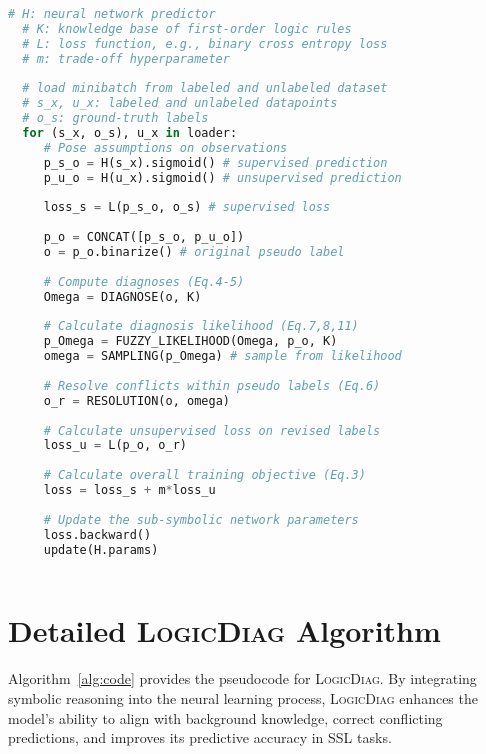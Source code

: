 \documentclass[10pt,twocolumn,letterpaper]{article}
\def\Ours{{\textsc{LogicDiag}}}
\begin{document}
\begin{algorithm}[t]
  \caption{{\Ours} Pseudocode, PyTorch-like style}
  \label{alg:code}
  \begin{lstlisting}[language=python]
  # H: neural network predictor
  # K: knowledge base of first-order logic rules
  # L: loss function, e.g., binary cross entropy loss
  # m: trade-off hyperparameter
  
  # load minibatch from labeled and unlabeled dataset
  # s_x, u_x: labeled and unlabeled datapoints
  # o_s: ground-truth labels
  for (s_x, o_s), u_x in loader:
     # Pose assumptions on observations
     p_s_o = H(s_x).sigmoid() # supervised prediction
     p_u_o = H(u_x).sigmoid() # unsupervised prediction
  
     loss_s = L(p_s_o, o_s) # supervised loss
  
     p_o = CONCAT([p_s_o, p_u_o])
     o = p_o.binarize() # original pseudo label
  
     # Compute diagnoses (Eq.4-5)
     Omega = DIAGNOSE(o, K)
  
     # Calculate diagnosis likelihood (Eq.7,8,11)
     p_Omega = FUZZY_LIKELIHOOD(Omega, p_o, K)
     omega = SAMPLING(p_Omega) # sample from likelihood
  
     # Resolve conflicts within pseudo labels (Eq.6)
     o_r = RESOLUTION(o, omega)
  
     # Calculate unsupervised loss on revised labels
     loss_u = L(p_o, o_r)
  
     # Calculate overall training objective (Eq.3)
     loss = loss_s + m*loss_u
  
     # Update the sub-symbolic network parameters
     loss.backward()
     update(H.params)
  
  \end{lstlisting}
\end{algorithm}


\section{Detailed {\Ours} Algorithm}\label{sec:algorithm}
Algorithm~\ref{alg:code} provides the pseudocode for {\Ours}. By integrating symbolic reasoning into the neural learning process, {\Ours} enhances the model's ability to align with background knowledge, correct conflicting predictions, and improves its predictive accuracy in SSL tasks.
\end{document}
